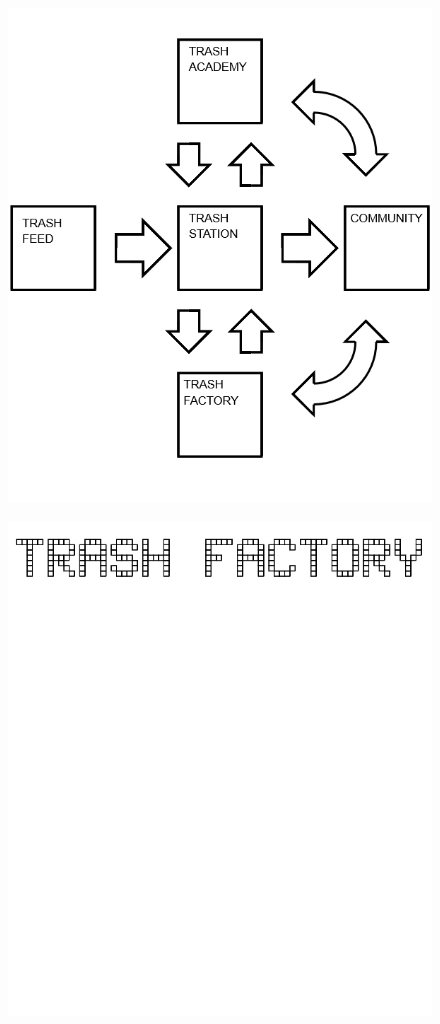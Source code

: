 \documentclass[17pt]{extreport}
\begin{document}
	\begin{figure}
		\centering
		\includegraphics[width=7.5in]{imageserver/uploadimages/trashgraph.png}
	\end{figure}
	\begin{figure}
		\centering
		\includegraphics[width=7.5in]{imageserver/uploadimages/trashfactory.png}
	\end{figure}
\end{document}
